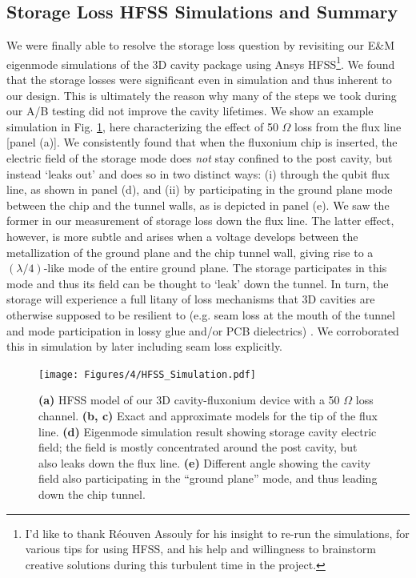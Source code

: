 \subsection{Storage Loss HFSS Simulations and Summary}

We were finally able to resolve the storage loss question by revisiting our E\&M eigenmode simulations of the 3D cavity package using Ansys HFSS\footnote{I'd like to thank R\'eouven Assouly for his insight to re-run the simulations, for various tips for using HFSS, and his help and willingness to brainstorm creative solutions during this turbulent time in the project.}. We found that the storage losses were significant even in simulation and thus inherent to our design. This is ultimately the reason why many of the steps we took during our A/B testing did not improve the cavity lifetimes. We show an example simulation in Fig. \ref{fig:4_HFSS_Simulation}, here characterizing the effect of 50 $\Omega$ loss from the flux line [panel (a)]. We consistently found that when the fluxonium chip is inserted, the electric field of the storage mode does \textit{not} stay confined to the post cavity, but instead `leaks out' and does so in two distinct ways: (i) through the qubit flux line, as shown in panel (d), and (ii) by participating in the ground plane mode between the chip and the tunnel walls, as is depicted in panel (e). We saw the former in our measurement of storage loss down the flux line. The latter effect, however, is more subtle and arises when a voltage develops between the metallization of the ground plane and the chip tunnel wall, giving rise to a $(\lambda/4)$-like mode of the entire ground plane. The storage participates in this mode and thus its field can be thought to `leak' down the tunnel. In turn, the storage will experience a full litany of loss mechanisms that 3D cavities are otherwise supposed to be resilient to (e.g. seam loss at the mouth of the tunnel and mode participation in lossy glue and/or PCB dielectrics) \cite{reagor2013reaching,brecht2015demonstration,reagor2016quantum}. We corroborated this in simulation by later including seam loss explicitly. 

\begin{figure}[t]
    \centering
    \texttt{[image: Figures/4/HFSS\_Simulation.pdf]}
    \caption{\textbf{(a)} HFSS model of our 3D cavity-fluxonium device with a 50 $\Omega$ loss channel. \textbf{(b, c)} Exact and approximate models for the tip of the flux line. \textbf{(d)} Eigenmode simulation result showing storage cavity electric field; the field is mostly concentrated around the post cavity, but also leaks down the flux line. \textbf{(e)} Different angle showing the cavity field also participating in the ``ground plane'' mode, and thus leading down the chip tunnel.}
    \label{fig:4_HFSS_Simulation}
\end{figure}

